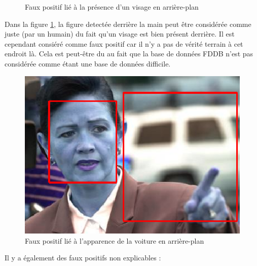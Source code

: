 \documentclass[a4paper,11pt]{article}
\begin{document}
\begin{figure}[H]
\begin{minipage}[c]{0.45\linewidth}
\begin{center}
	                \caption{Faux positif lié à la présence d'un visage en arrière-plan}
			\label{fig:fp}
	            \end{center}
	        \end{minipage}
	    \end{figure}

	    Dans la figure \ref{fig:fp}, la figure detectée derrière la main peut être considérée comme
	    juste (par un humain) du fait qu'un visage est bien présent derrière. Il est cependant consiéré comme
	    faux positif car il n'y a pas de vérité terrain à cet endroit là. Cela est peut-être du
	    au fait que la base de données FDDB n'est pas considérée comme étant une base de données
	    difficile.
	    
	    \begin{figure}[H]
	        \begin{center}
	            \includegraphics[scale=0.45]{facenetFP5.png}
	            \caption{Faux positif lié à l'apparence de la voiture en arrière-plan}
	        \end{center}
	    \end{figure}
	    
	    \newpage
	    Il y a également des faux positifs non explicables :\\
	    
\end{document}
